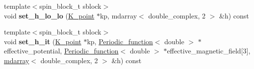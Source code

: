 \begin{DoxyCompactItemize}
\item 
\hypertarget{classsirius_1_1_band_a9712fabdb24cd5b4357d164dc91787b1}{}{\footnotesize template$<$spin\+\_\+block\+\_\+t sblock$>$ }\\void {\bfseries set\+\_\+h\+\_\+lo\+\_\+lo} (\hyperlink{classsirius_1_1_k__point}{K\+\_\+point} $\ast$kp, mdarray$<$ double\+\_\+complex, 2 $>$ \&h) const \label{classsirius_1_1_band_a9712fabdb24cd5b4357d164dc91787b1}

\item 
\hypertarget{classsirius_1_1_band_add04335abe6ac70f46aa6c58842bb6de}{}{\footnotesize template$<$spin\+\_\+block\+\_\+t sblock$>$ }\\void {\bfseries set\+\_\+h\+\_\+it} (\hyperlink{classsirius_1_1_k__point}{K\+\_\+point} $\ast$kp, \hyperlink{classsirius_1_1_periodic__function}{Periodic\+\_\+function}$<$ double $>$ $\ast$effective\+\_\+potential, \hyperlink{classsirius_1_1_periodic__function}{Periodic\+\_\+function}$<$ double $>$ $\ast$effective\+\_\+magnetic\+\_\+field\mbox{[}3\mbox{]}, \hyperlink{classsddk_1_1mdarray}{mdarray}$<$ double\+\_\+complex, 2 $>$ \&h) const \label{classsirius_1_1_band_add04335abe6ac70f46aa6c58842bb6de}

\end{DoxyCompactItemize}
